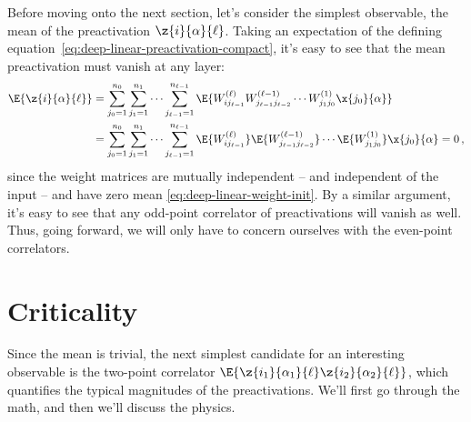 Before moving onto the next section, let's consider the simplest observable, the mean of the preactivation $\z{i}{\alpha}{\ell}$.
Taking an expectation of the defining equation~\eqref{eq:deep-linear-preactivation-compact},
it's easy to see that the mean preactivation must vanish at any layer:
\begin{align}
\E{\z{i}{\alpha}{\ell}}&=\sum_{j_0=1}^{n_0} \sum_{j_1=1}^{n_1}\cdots \sum_{j_{\ell-1}=1}^{n_{\ell-1}} \E{W_{i j_{\ell-1}}^{(\ell)} W_{j_{\ell-1}j_{\ell-2}}^{(\ell-1)} \cdots W_{j_{1} j_{0}}^{(1)} \x{j_{0}}{\alpha}}  \, \\
&=\sum_{j_0=1}^{n_0} \sum_{j_1=1}^{n_1}\cdots \sum_{j_{\ell-1}=1}^{n_{\ell-1}}  \E{W_{i j_{\ell-1}}^{(\ell)}} \E{ W_{j_{\ell-1}j_{\ell-2}}^{(\ell-1)}} \cdots \E{W_{j_{1} j_{0}}^{(1)}} \x{j_{0}}{\alpha}= 0\, ,\notag
\end{align}
since the weight matrices are mutually independent -- and independent of the input -- and have zero mean \eqref{eq:deep-linear-weight-init}. By a similar argument, it's easy to see that any odd-point correlator of preactivations will vanish as well. Thus, going forward, we will only have to concern ourselves with the even-point correlators.









\section{Criticality}\label{sec:criticality_DLN}



Since the mean is trivial, 
the next simplest candidate for an interesting observable 
is the two-point correlator $\E{\z{i_1}{\alpha_1}{\ell}\z{i_2}{\alpha_2}{\ell}}$, which quantifies the typical magnitudes of the preactivations. We'll first go through the math, and then we'll discuss the physics.

